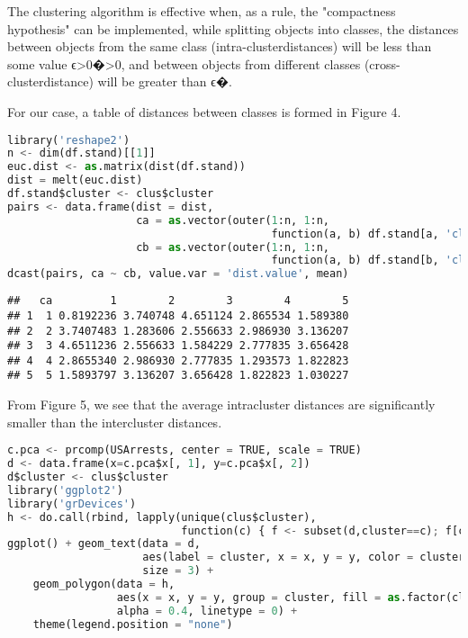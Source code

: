 The clustering algorithm is effective when, as a rule, the "compactness
hypothesis" can be implemented, while splitting objects into classes,
the distances between objects from the same class
(intra-clusterdistances) will be less than some value
ϵ\textgreater0�\textgreater0, and between objects from different classes
(cross-clusterdistance) will be greater than ϵ�.

For our case, a table of distances between classes is formed in Figure
4.

\begin{lstlisting}[language=Python]
library('reshape2')
n <- dim(df.stand)[[1]] 
euc.dist <- as.matrix(dist(df.stand))
dist = melt(euc.dist)
df.stand$cluster <- clus$cluster
pairs <- data.frame(dist = dist, 
                    ca = as.vector(outer(1:n, 1:n,
                                         function(a, b) df.stand[a, 'cluster'])),
                    cb = as.vector(outer(1:n, 1:n,
                                         function(a, b) df.stand[b, 'cluster'])))
dcast(pairs, ca ~ cb, value.var = 'dist.value', mean)
\end{lstlisting}
  
\begin{lstlisting}
##   ca         1        2        3        4        5
## 1  1 0.8192236 3.740748 4.651124 2.865534 1.589380
## 2  2 3.7407483 1.283606 2.556633 2.986930 3.136207
## 3  3 4.6511236 2.556633 1.584229 2.777835 3.656428
## 4  4 2.8655340 2.986930 2.777835 1.293573 1.822823
## 5  5 1.5893797 3.136207 3.656428 1.822823 1.030227
\end{lstlisting}

From Figure 5, we see that the average intracluster distances are
significantly smaller than the intercluster distances.

\begin{lstlisting}[language=Python]
c.pca <- prcomp(USArrests, center = TRUE, scale = TRUE) 
d <- data.frame(x=c.pca$x[, 1], y=c.pca$x[, 2])
d$cluster <- clus$cluster
library('ggplot2')
library('grDevices')
h <- do.call(rbind, lapply(unique(clus$cluster),
                           function(c) { f <- subset(d,cluster==c); f[chull(f),]}))
ggplot() + geom_text(data = d, 
                     aes(label = cluster, x = x, y = y, color = cluster), 
                     size = 3) +
    geom_polygon(data = h, 
                 aes(x = x, y = y, group = cluster, fill = as.factor(cluster)),
                 alpha = 0.4, linetype = 0) +
    theme(legend.position = "none")
\end{lstlisting}

